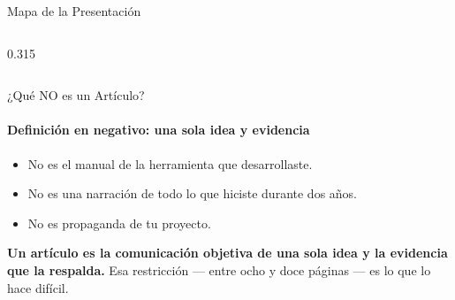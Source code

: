 \documentclass[aspectratio=169, 12pt]{beamer}
\newcommand{\chip}[2][Ember]{%
  \tcbox[on line, colback=#1, colframe=#1, arc=1pt,
         boxsep=1pt, left=4pt, right=4pt, top=1.5pt, bottom=1.5pt,
         fontupper=\sffamily\tiny\bfseries\color{OffWhite}\MakeUppercase]{#2}%
}
\newcommand{\balanceicon}[1][2cm]{%
  \begin{tikzpicture}[scale=1, baseline={(current bounding box.center)}]
    \draw[black,line width=0.8pt] (0.5,0) -- (0.5,0.8#1);
    \draw[black,line width=0.8pt] (0.2,0.8#1) -- (0.8,0.8#1);
    \draw[black,line width=0.6pt] (0.25,0.8#1) -- (0.5,0.7#1) -- (0.75,0.8#1);
    \draw[black,line width=0.6pt] (0.28,0.52#1) -- (0.31,0.2#1); 
    \draw[black,line width=0.6pt] (0.72,0.52#1) -- (0.69,0.2#1);
    \fill[Ember] (0.22,0.28#1) circle (0.03#1);
    \fill[Ember] (0.68,0.28#1) circle (0.03#1);
  \end{tikzpicture}%
}
\begin{document}
\begin{frame}{Mapa de la Presentación}
\begin{columns}[T, totalwidth=\textwidth]
    \hfill

    \begin{column}{0.315\textwidth}
    \end{column}

  \end{columns}
\end{frame}

\begin{frame}{¿Qué NO es un Artículo?}
  \framesubtitle{Definición en negativo: una sola idea y evidencia}
  \vspace{-2pt}

  \begin{itemize}
    \item No es el manual de la herramienta que desarrollaste.
    \item No es una narración de todo lo que hiciste durante dos años.
    \item No es propaganda de tu proyecto.
  \end{itemize}

  \vspace{0.5cm}
  {\color{OffWhite}\rmfamily\bfseries\normalsize Un artículo es la comunicación objetiva de una sola idea y la evidencia que la respalda.}
  \vspace{0.3cm}
  {\color{Cloud}\sffamily\fontsize{8}{10}\selectfont Esa restricción — entre ocho y doce páginas — es lo que lo hace difícil.}
\end{frame}
\end{document}
